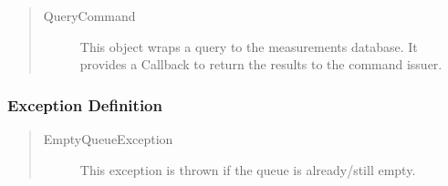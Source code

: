 \begin{quote}
	\begin{description}
		\item[QueryCommand] This object wraps a query to the measurements database. It
		provides a Callback to return the results to the command issuer.
	\end{description} 
\end{quote}

\subsubsection{Exception Definition}

\begin{quote}
	\begin{description}
		\item[EmptyQueueException] This exception is thrown if the queue is
		already/still empty.
	\end{description} 
\end{quote}

